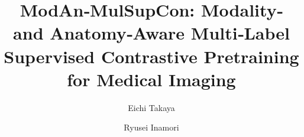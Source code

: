 \documentclass[final,1p,times]{elsarticle}
\begin{document}
\begin{frontmatter}



\title{ModAn‑MulSupCon: Modality‑ and Anatomy‑Aware Multi‑Label Supervised Contrastive Pretraining for Medical Imaging}


\author[label1,label2,label3]{Eichi Takaya} %
\author[label2]{Ryusei Inamori}

\address[label1]{AI Lab, Tohoku University Hospital, Miyagi, Japan}
\address[label2]{Department of Diagnostic Imaging, Tohoku University Graduate School of Medicine, Miyagi, Japan}
\address[label3]{Department of Medical Information and Communication Technology Research, St.Marianna University Graduate School of Medicine, Kanagawa, Japan}


\end{frontmatter}
\end{document}
